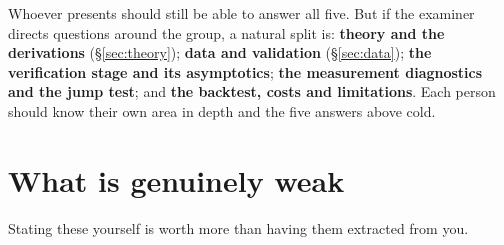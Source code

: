 \documentclass[11pt,a4paper]{article}
\begin{document}
\begin{keybox}
Whoever presents should still be able to answer all five. But if the examiner directs questions
around the group, a natural split is: \textbf{theory and the derivations}
(\S\ref{sec:theory}); \textbf{data and validation} (\S\ref{sec:data}); \textbf{the verification
stage and its asymptotics}; \textbf{the measurement diagnostics and the jump test}; and
\textbf{the backtest, costs and limitations}. Each person should know their own area in depth
and the five answers above cold.
\end{keybox}

\section{What is genuinely weak}

Stating these yourself is worth more than having them extracted from you.
\end{document}

